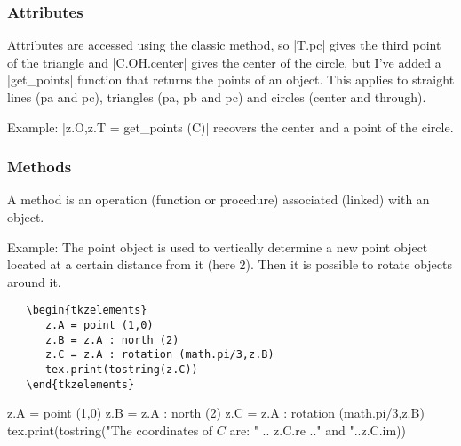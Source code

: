  \vspace{1em}

 \subsubsection{Attributes} %
 \label{ssub:attributes}
 Attributes are accessed using the classic method, so |T.pc| gives the third point  of the triangle and |C.OH.center| gives the center of the circle, but I've added a |get_points| function that returns the points of an object. This applies to straight lines (pa and pc), triangles (pa, pb and pc) and circles (center and through).

  \vspace{1em}
  Example: |z.O,z.T = get_points (C)| recovers the center and a point of the circle.

\subsubsection{Methods} %
\label{ssub:methods}

A method is an operation (function or procedure) associated (linked) with an object.

Example:   The point object is used to vertically determine a new point object located at a certain distance from it (here 2). Then it is possible to rotate objects around it.

\begin{verbatim}
   \begin{tkzelements}
      z.A = point (1,0)
      z.B = z.A : north (2)             
      z.C = z.A : rotation (math.pi/3,z.B)
      tex.print(tostring(z.C))
   \end{tkzelements}
\end{verbatim}

\begin{tkzelements}
   z.A = point (1,0)
   z.B = z.A : north (2)
   z.C = z.A : rotation (math.pi/3,z.B)
   tex.print(tostring("The coordinates of $C$ are: " .. z.C.re .." and "..z.C.im))
\end{tkzelements}


\endinput